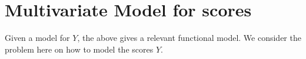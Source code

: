 \documentclass[11pt]{article}
\newcommand{\Var}{\textrm{Var}}
\newcommand{\Cov}{\textrm{Cov}}
\begin{document}
%





\section{Multivariate Model for scores}

Given a model for $Y$, the above gives a relevant functional model. We consider the problem here on how to model the scores $Y$. 

\end{document}
